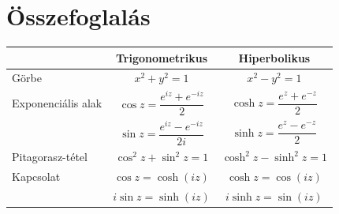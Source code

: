 \documentclass[11pt]{scrartcl}
\theoremstyle{definition}
\theoremstyle{remark}
\begin{document}
\section{Összefoglalás}

\begin{center}
	\renewcommand{\arraystretch}{2.4}
	\begin{tabular}{@{}lcc@{}}
		\toprule
		                                & Trigonometrikus                    & Hiperbolikus \\
		\midrule
		Görbe                           & $x^2 + y^2 = 1$                    &
		$x^2 - y^2 = 1$                                                                     \\
		Exponenciális alak              &
		$\cos z = \dfrac{e^{iz} + e^{-iz}}{2}$ &
		$\cosh z = \dfrac{e^{z} + e^{-z}}{2}$                                                      \\
		                                & $\sin z = \dfrac{e^{iz} - e^{-iz}}{2i}$ &
		$\sinh z = \dfrac{e^{z} - e^{-z}}{2}$                                                      \\
		Pitagorasz-tétel                & $\cos^2 z + \sin^2 z = 1$          &
		$\cosh^2 z - \sinh^2 z = 1$                                                         \\
		Kapcsolat                       & $\cos z = \cosh(iz)$               &
		$\cosh z = \cos(iz)$                                                                \\
		                                & $i \sin z = \sinh(iz)$             &
		$i \sinh z = \sin(iz)$                                                              \\
		\bottomrule
	\end{tabular}
\end{center}
\end{document}
